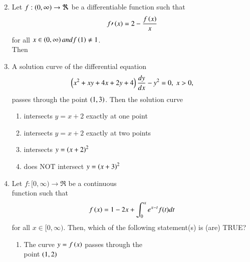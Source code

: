 \documentclass[journal,12pt,twocolumn,article]{IEEEtran}
\theoremstyle{remark}
\begin{document}
\begin{enumerate}[start = 6]
\begin{enumerate}
\begin{multicols}{2}
\end{multicols}
\end{enumerate}
\item Let $f:\left(0,\infty\right) \rightarrow \Re$ be a differentiable function such that 
\begin{align*}
f\prime\left(x\right) = 2-\frac{f\left(x\right)}{x}
\end{align*} for all $x \in \left(0,\infty\right) and f\left(1\right) \neq 1$. \\Then
\hfill{}
\begin{enumerate}
\end{enumerate}
\item A solution curve of the differential equation 
\begin{align*}
\left(x^2+xy+4x+2y+4\right)\frac{dy}{dx}-y^2=0,\;x>0,
\end{align*} passes through the point $\left(1,3\right)$. Then the solution curve
\hfill{}
\begin{enumerate}
\item intersects $y=x+2$ exactly at one point
\item intersects $y=x+2$ exactly at two points
\item intersects $y=\left(x+2\right)^2$ 
\item does NOT intersect $y=\left(x+3\right)^2$
\end{enumerate}
\item Let $f:[0,\infty)\rightarrow \Re$ be a continuous \\function such that
\begin{align*}
f\left(x\right) = 1-2x+ \int_0^x e^{x-t} f(t) dt
\end{align*} for all $x\in[0,\infty)$. Then, which of the following statement(s) is (are) TRUE?
\hfill{}
\begin{enumerate}
\item The curve $y=f\left(x\right)$ passes through the \\point $\left(1,2\right)$

\end{enumerate}
\end{enumerate}
\end{document}
